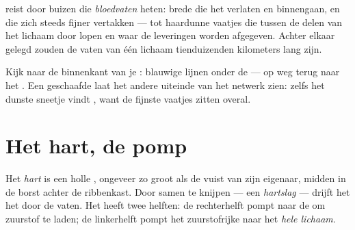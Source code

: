 \begin{definition}[Bloedvaten]\label{def:g4:heart-and-blood:vessels}
 reist door buizen die \emph{bloedvaten} heten:
brede die het  verlaten en binnengaan, en die zich steeds fijner
vertakken --- tot haardunne vaatjes die tussen de delen van het lichaam
door lopen en waar de leveringen worden afgegeven. Achter elkaar gelegd
zouden de vaten van één lichaam tienduizenden kilometers lang zijn.
\end{definition}

\begin{remark}\label{rem:g4:heart-and-blood:see}
Kijk naar de binnenkant van je : blauwige lijnen onder de  ---
 op weg terug naar het . Een geschaafde  laat het
andere uiteinde van het netwerk zien: zelfs het dunste sneetje vindt
, want de fijnste vaatjes zitten overal.
\end{remark}

\section{Het hart, de pomp}

\begin{definition}\label{def:g4:heart-and-blood:heart}
Het \emph{hart} is een holle , ongeveer zo groot als de
vuist van zijn eigenaar, midden in de borst achter de ribbenkast. Door
samen te knijpen --- een \emph{hartslag} --- drijft het
het  door de vaten. Het heeft twee helften: de rechterhelft pompt
 naar de \emph{} om zuurstof te laden; de linkerhelft pompt
het zuurstofrijke  naar het \emph{hele lichaam}.
\end{definition}

